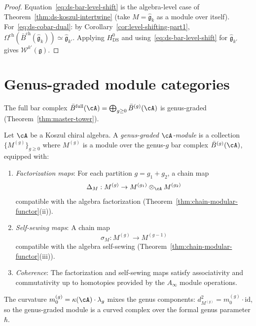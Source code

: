 \begin{proof}
Equation~\eqref{eq:ds-bar-level-shift} is the algebra-level case of Theorem~\ref{thm:ds-koszul-intertwine} (take $M = \widehat{\mathfrak{g}}_k$ as a module over itself).  For~\eqref{eq:ds-cobar-dual}: by Corollary~\ref{cor:level-shifting-part1}, $\Omega^{\mathrm{ch}}(\bar{B}^{\mathrm{ch}}(\widehat{\mathfrak{g}}_k)) \simeq \widehat{\mathfrak{g}}_{k'}$.  Applying $H^0_{\mathrm{DS}}$ and using~\eqref{eq:ds-bar-level-shift} for $\widehat{\mathfrak{g}}_{k'}$ gives $\mathcal{W}^{k'}(\mathfrak{g})$.
\end{proof}

\section{Genus-graded module categories}\label{sec:genus-graded-modules}

The full bar complex $\bar{B}^{\mathrm{full}}(\cA) = \bigoplus_{g \geq 0}
\bar{B}^{(g)}(\cA)$ is genus-graded (Theorem~\ref{thm:master-tower}).

\begin{definition}\label{def:genus-graded-module}
Let $\cA$ be a Koszul chiral algebra.  A \emph{genus-graded
$\cA$-module} is a collection $\{M^{(g)}\}_{g \geq 0}$ where
$M^{(g)}$ is a module over the genus-$g$ bar complex
$\bar{B}^{(g)}(\cA)$, equipped with:
\begin{enumerate}[label=\textup{(\roman*)}]
\item \emph{Factorization maps}: For each partition $g = g_1 + g_2$,
  a chain map
  \begin{equation}\label{eq:module-factorization}
  \Delta_M: M^{(g)} \to M^{(g_1)} \otimes_{\cA} M^{(g_2)}
  \end{equation}
  compatible with the algebra factorization
  (Theorem~\ref{thm:chain-modular-functor}(ii)).
\item \emph{Self-sewing maps}: A chain map
  \begin{equation}\label{eq:module-self-sewing}
  \sigma_M: M^{(g)} \to M^{(g-1)}
  \end{equation}
  compatible with the algebra self-sewing
  (Theorem~\ref{thm:chain-modular-functor}(iii)).
\item \emph{Coherence}: The factorization and self-sewing maps
  satisfy associativity and commutativity up to homotopies
  provided by the $A_\infty$ module operations.
\end{enumerate}

The curvature $m_0^{(g)} = \kappa(\cA) \cdot \lambda_g$ mixes
the genus components: $d_{M^{(g)}}^2 = m_0^{(g)} \cdot \mathrm{id}$,
so the genus-graded module is a curved complex over the formal
genus parameter $\hbar$.
\end{definition}


